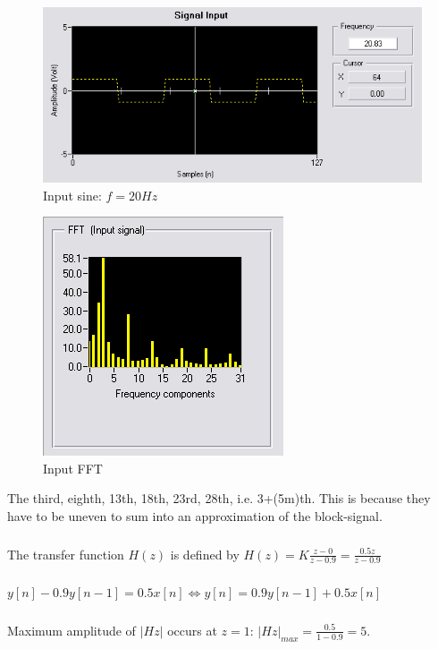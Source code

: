 \documentclass[a4paper, 12pt, titlepage]{article}
\begin{document}
\subsubsection{}
\begin{figure}[H]
\includegraphics[scale=0.7]{3input.png}
\caption{Input sine: $f=20Hz$}
\end{figure}
\begin{figure}[H]
\includegraphics[scale=0.7]{3FFTinput.png}
\caption{Input FFT}
\label{fig:3FFTinput}
\end{figure}
The third, eighth, 13th, 18th, 23rd, 28th, i.e. 3+(5m)th. This is because they
have to be uneven to sum into an approximation of the block-signal.
\subsubsection{}
The transfer function $H(z)$ is defined by $H(z) = K
\frac{z-0}{z-0.9}=\frac{0.5 z}{z-0.9}$
\subsubsection{}
$y[n]-0.9y[n-1]=0.5 x[n] \Leftrightarrow y[n] = 0.9 y[n-1] + 0.5 x[n]$
\subsubsection{}
Maximum amplitude of $\lvert Hz\rvert $ occurs at $z=1$: $\lvert Hz\rvert _{max}
= \frac {0.5}{1-0.9} = 5$. 
\end{document}
